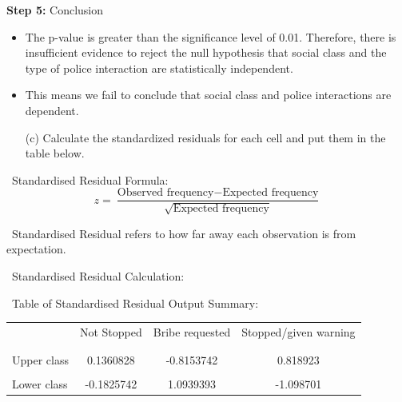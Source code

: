 \documentclass[12pt,letterpaper]{article}
\begin{document}
\vspace{0.5cm}
\noindent\textbf{Step 5:} Conclusion
\begin{itemize}
	\item 
	The p-value is greater than the significance level of 0.01. Therefore, there is insufficient evidence to reject the null hypothesis that social class and the type of police interaction are statistically independent.
	\item
	This means we fail to conclude that social class and police interactions are dependent. 
\end{itemize}

\newpage
\vspace{1cm}
\begin{enumerate}
\item [(c)] Calculate the standardized residuals for each cell and put them in the table below.
\end{enumerate}
\vspace{0.5cm}	
\noindent\ Standardised Residual Formula:
\vspace{0.5cm}
\[
z = \frac{\text{Observed frequency} - \text{Expected frequency}}{\sqrt{\text{Expected frequency}}}
\]

\vspace{0.5cm}
\noindent\ Standardised Residual refers to how far away each observation is from expectation. 
\vspace{0.5cm}

\noindent\ Standardised Residual Calculation:
\vspace{0.5cm}


\vspace{0.5cm}
\noindent\ Table of Standardised Residual Output Summary:
	\begin{table}[h]
		\centering
		\begin{tabular}{l | c c c }
			& Not Stopped & Bribe requested & Stopped/given warning \\
			\\[-1.8ex] 
			\hline \\[-1.8ex]
			Upper class  & 0.1360828  & -0.8153742 & 0.818923 \\
			\\
			Lower class & -0.1825742 & 1.0939393  &  -1.098701 \\
			
		\end{tabular}
	\end{table}
	
\end{document}
